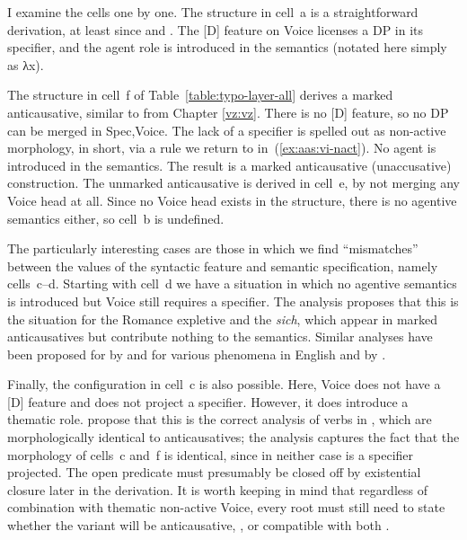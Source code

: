 \begin{exe}
\begin{xlist}
\begin{exe}
\begin{exe}
\begin{xlist}
\begin{exe}
I examine the cells one by one. The structure in cell~a is a straightforward  derivation, at least since \cite{kratzer96} and \cite{pylkkanen08}. The [D] feature on Voice licenses a DP in its specifier, and the agent role is introduced in the semantics (notated here simply as λx).

The structure in cell~f of Table~\ref{table:typo-layer-all} derives a marked anticausative, similar to {\tnif} from Chapter \ref{vz:vz}. There is no [D] feature, so no DP can be merged in Spec,Voice. The lack of a specifier is spelled out as non-active morphology,  in short, via a rule we return to in~(\ref{ex:aas:vi-nact}). No agent is introduced in the semantics. The result is a marked anticausative (unaccusative) construction. The unmarked anticausative is derived in cell~e, by not merging any Voice head at all. Since no Voice head exists in the structure, there is no agentive semantics either, so cell~b is undefined.

The particularly interesting cases are those in which we find ``mismatches'' between the values of the syntactic feature and semantic specification, namely cells~c--d. Starting with cell~d we have a situation in which no agentive semantics is introduced but Voice still requires a specifier. The  analysis proposes that this is the situation for the Romance expletive  and the  \emph{sich}, which appear in marked anticausatives but contribute nothing to the semantics. Similar analyses have been proposed for  by \cite{wood14nllt,wood15springer} and for various phenomena in English and  by \cite{myler16mit}.

Finally, the configuration in cell~c is also possible. Here, Voice does not have a [D] feature and does not project a specifier. However, it does introduce a thematic role. \cite{layering15} propose that this is the correct analysis of  verbs in , which are morphologically identical to anticausatives; the analysis captures the fact that the morphology of cells~c and~f is identical, since in neither case is a specifier projected. The open predicate must presumably be closed off by existential closure later in the derivation. It is worth keeping in mind that regardless of combination with thematic non-active Voice, every root must still need to state whether the  variant will be anticausative, , or compatible with both \citep[88]{alexiadouanagnostopoulou04,layering15}.



\end{exe}
\end{xlist}
\end{exe}
\end{exe}
\end{xlist}
\end{exe}
